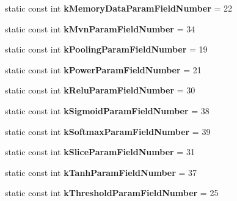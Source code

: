 \begin{DoxyCompactItemize}
static const int {\bfseries k\+Memory\+Data\+Param\+Field\+Number} = 22
\item 
\mbox{\label{classcaffe_1_1_v1_layer_parameter_ace85391bfa0f75f48ef6b8ab67b52fac}} 
static const int {\bfseries k\+Mvn\+Param\+Field\+Number} = 34
\item 
\mbox{\label{classcaffe_1_1_v1_layer_parameter_a18dfc3903f2be2cb4ce7936685089cfa}} 
static const int {\bfseries k\+Pooling\+Param\+Field\+Number} = 19
\item 
\mbox{\label{classcaffe_1_1_v1_layer_parameter_a5b1b2de867adfbae7cafe76ade056ba9}} 
static const int {\bfseries k\+Power\+Param\+Field\+Number} = 21
\item 
\mbox{\label{classcaffe_1_1_v1_layer_parameter_a2d60a4e6b201be4da0c040e9eacb17ea}} 
static const int {\bfseries k\+Relu\+Param\+Field\+Number} = 30
\item 
\mbox{\label{classcaffe_1_1_v1_layer_parameter_a866c2933807fdd10b5568f67595ac021}} 
static const int {\bfseries k\+Sigmoid\+Param\+Field\+Number} = 38
\item 
\mbox{\label{classcaffe_1_1_v1_layer_parameter_a0a5eeb4a4d3b56a17589dbb8392a7077}} 
static const int {\bfseries k\+Softmax\+Param\+Field\+Number} = 39
\item 
\mbox{\label{classcaffe_1_1_v1_layer_parameter_a1fa1bbd14a814cd24aa0f3920aedab0c}} 
static const int {\bfseries k\+Slice\+Param\+Field\+Number} = 31
\item 
\mbox{\label{classcaffe_1_1_v1_layer_parameter_a80a69727fe5696bf6b9be67690540e8b}} 
static const int {\bfseries k\+Tanh\+Param\+Field\+Number} = 37
\item 
\mbox{\label{classcaffe_1_1_v1_layer_parameter_ae0c4acd27d77d73e20f28123c0269779}} 
static const int {\bfseries k\+Threshold\+Param\+Field\+Number} = 25
\item 

\end{DoxyCompactItemize}
